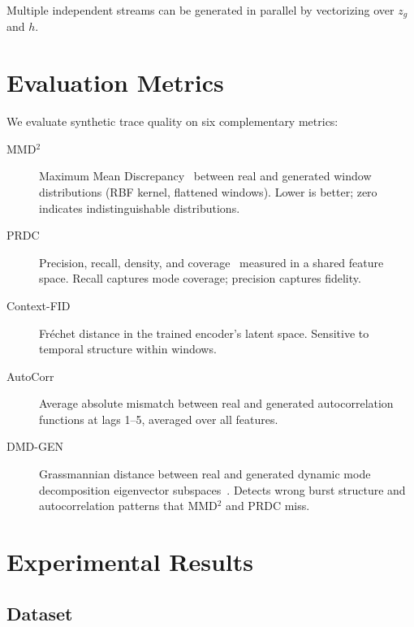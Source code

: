 \documentclass[10pt,twocolumn]{article}
\newcommand{\mmd}{MMD$^2$\xspace}
\newcommand{\dmdgen}{DMD-GEN\xspace}
\begin{document}
Multiple independent streams can be generated in parallel by
vectorizing over $z_g$ and $h$.


\section{Evaluation Metrics}
\label{sec:eval}

We evaluate synthetic trace quality on six complementary metrics:

\begin{description}
  \item[\mmd] Maximum Mean Discrepancy~\cite{gretton2012kernel} between
    real and generated window distributions (RBF kernel, flattened windows).
    Lower is better; zero indicates indistinguishable distributions.

  \item[PRDC] Precision, recall, density, and coverage~\cite{naeem2020reliable}
    measured in a shared feature space.  Recall captures mode coverage;
    precision captures fidelity.

  \item[Context-FID] Fréchet distance in the trained encoder's latent
    space.  Sensitive to temporal structure within windows.

  \item[AutoCorr] Average absolute mismatch between real and generated
    autocorrelation functions at lags 1--5, averaged over all features.

  \item[\dmdgen] Grassmannian distance between real and generated
    dynamic mode decomposition eigenvector subspaces~\cite{dmdgen2025}.
    Detects wrong burst structure and autocorrelation patterns that
    MMD$^2$ and PRDC miss.
\end{description}


\section{Experimental Results}
\label{sec:results}

\subsection{Dataset}
\end{document}
